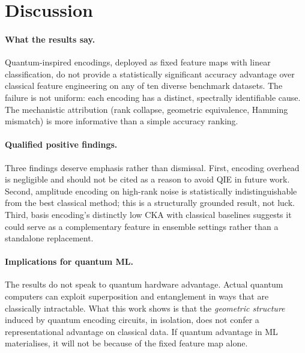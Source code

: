 \section{Discussion}
\label{sec:discussion}

\paragraph{What the results say.}
Quantum-inspired encodings, deployed as fixed feature maps with linear
classification, do not provide a statistically significant accuracy advantage
over classical feature engineering on any of ten diverse benchmark datasets.
The failure is not uniform: each encoding has a distinct, spectrally
identifiable cause.
The mechanistic attribution (rank collapse, geometric equivalence, Hamming
mismatch) is more informative than a simple accuracy ranking.

\paragraph{Qualified positive findings.}
Three findings deserve emphasis rather than dismissal.
First, encoding overhead is negligible and should not be cited as a reason to
avoid QIE in future work.
Second, amplitude encoding on high-rank noise is statistically
indistinguishable from the best classical method; this is a structurally
grounded result, not luck.
Third, basis encoding's distinctly low CKA with classical baselines suggests
it could serve as a complementary feature in ensemble settings rather than a
standalone replacement.

\paragraph{Implications for quantum ML.}
The results do not speak to quantum hardware advantage.
Actual quantum computers can exploit superposition and entanglement in ways
that are classically intractable.
What this work shows is that the \emph{geometric structure} induced by quantum
encoding circuits, in isolation, does not confer a representational advantage
on classical data.
If quantum advantage in ML materialises, it will not be because of the fixed
feature map alone.

